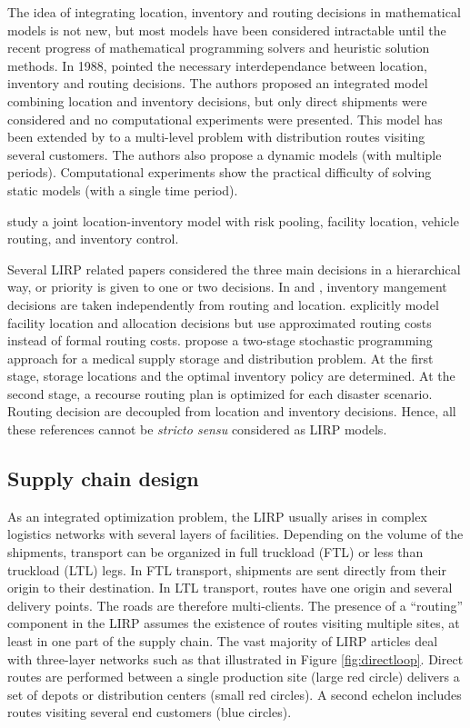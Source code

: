 \documentclass[a4paper,10pt]{article}
\begin{document}
\begin{linenumbers}
 The idea of integrating location, inventory and routing decisions in mathematical models is not new, but most models have been considered intractable until the recent progress of mathematical programming solvers and heuristic solution methods. 
In 1988, \cite{PerSir88} pointed the necessary interdependance between location, inventory and routing decisions. 
The authors proposed an integrated model combining location and inventory decisions, but only direct shipments were considered and no computational experiments were presented. 
This model has been extended by \cite{AmbScu05} to a multi-level problem with distribution routes visiting several customers. The authors also propose a dynamic models (with multiple periods). Computational experiments show the practical difficulty of solving static models (with a single time period). 

\cite{DasCShen02} study a joint location-inventory model with risk pooling, facility location, vehicle routing, and inventory control.

Several LIRP related papers considered the three main decisions in a hierarchical way, or priority is given to one or two decisions. 
In \cite{LiuLee03} and \cite{LiuLin05}, inventory mangement decisions are taken independently from routing and location. 
\cite{Shen07} explicitly model facility location and allocation decisions but use approximated routing costs instead of formal routing costs. 
\cite{MetZab10} propose a two-stage stochastic programming approach for a medical supply
storage and distribution problem.
At the first stage, storage locations and the optimal inventory policy are determined. 
At the second stage, a recourse routing plan is optimized for each disaster scenario. 
Routing decision are decoupled from location and inventory decisions. 
Hence, all these references cannot be \textit{stricto sensu} considered as LIRP models. 

\subsection{Supply chain design}
\label{sec:l} 

As an integrated optimization problem, the LIRP usually arises in complex logistics networks with several layers of facilities. 
Depending on the volume of the shipments, transport can be organized in full truckload (FTL) or less than truckload (LTL) legs. 
In FTL transport, shipments are sent directly from their origin to their destination. In LTL transport, routes have one origin and several delivery points. The roads are therefore multi-clients. The presence of a ``routing'' component in the LIRP assumes the existence of routes visiting multiple sites, at least in one part of the supply chain.
The vast majority of LIRP articles deal with three-layer networks such as that illustrated in Figure \ref{fig:directloop}. 
Direct routes are performed between a single production site (large red circle) delivers a set of depots or distribution centers (small red circles). A second echelon includes routes visiting several end customers (blue circles).


\end{linenumbers}
\end{document}

